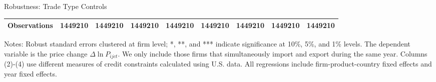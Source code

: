 \documentclass[10pt]{beamer}
\begin{document}
\begin{frame}{Robustness: Trade Type Controls}
\begin{table}[htbp]
{\begin{threeparttable}
\begin{tabular}{lcccccccc}
			Observations & 1449210 & 1449210 & 1449210 & 1449210 & 1449210 & 1449210 & 1449210 & 1449210\\
			\bottomrule
		\end{tabular}
		\begin{tablenotes}
			\footnotesize
			\item Notes: Robust standard errors clustered at firm level; *, **, and *** indicate significance at 10\%, 5\%, and 1\% levels. The dependent variable is the price change $\Delta \ln P_{ijct}$. We only include those firms that simultaneously import and export during the same year. Columns (2)-(4) use different measures of credit constraints calculated using U.S. data. All regressions include firm-product-country fixed effects and year fixed effects.
		\end{tablenotes}
	\end{threeparttable}
        }
	\label{tab.robust.tradetype}
    \end{table}
    \hyperlink{robustness_other}{}
\end{frame}
\end{document}
